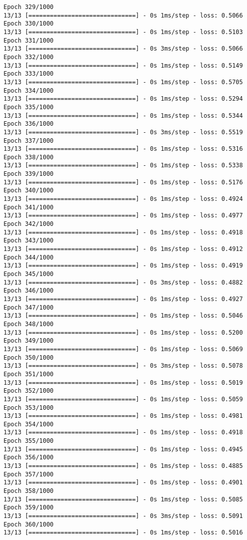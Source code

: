 \documentclass[11pt]{article}
\begin{document}
\begin{Verbatim}[commandchars=\\\{\}]
Epoch 329/1000
13/13 [==============================] - 0s 1ms/step - loss: 0.5066
Epoch 330/1000
13/13 [==============================] - 0s 1ms/step - loss: 0.5103
Epoch 331/1000
13/13 [==============================] - 0s 3ms/step - loss: 0.5066
Epoch 332/1000
13/13 [==============================] - 0s 1ms/step - loss: 0.5149
Epoch 333/1000
13/13 [==============================] - 0s 1ms/step - loss: 0.5705
Epoch 334/1000
13/13 [==============================] - 0s 1ms/step - loss: 0.5294
Epoch 335/1000
13/13 [==============================] - 0s 1ms/step - loss: 0.5344
Epoch 336/1000
13/13 [==============================] - 0s 3ms/step - loss: 0.5519
Epoch 337/1000
13/13 [==============================] - 0s 1ms/step - loss: 0.5316
Epoch 338/1000
13/13 [==============================] - 0s 1ms/step - loss: 0.5338
Epoch 339/1000
13/13 [==============================] - 0s 1ms/step - loss: 0.5176
Epoch 340/1000
13/13 [==============================] - 0s 1ms/step - loss: 0.4924
Epoch 341/1000
13/13 [==============================] - 0s 1ms/step - loss: 0.4977
Epoch 342/1000
13/13 [==============================] - 0s 1ms/step - loss: 0.4918
Epoch 343/1000
13/13 [==============================] - 0s 1ms/step - loss: 0.4912
Epoch 344/1000
13/13 [==============================] - 0s 1ms/step - loss: 0.4919
Epoch 345/1000
13/13 [==============================] - 0s 3ms/step - loss: 0.4882
Epoch 346/1000
13/13 [==============================] - 0s 1ms/step - loss: 0.4927
Epoch 347/1000
13/13 [==============================] - 0s 1ms/step - loss: 0.5046
Epoch 348/1000
13/13 [==============================] - 0s 1ms/step - loss: 0.5200
Epoch 349/1000
13/13 [==============================] - 0s 1ms/step - loss: 0.5069
Epoch 350/1000
13/13 [==============================] - 0s 3ms/step - loss: 0.5078
Epoch 351/1000
13/13 [==============================] - 0s 1ms/step - loss: 0.5019
Epoch 352/1000
13/13 [==============================] - 0s 1ms/step - loss: 0.5059
Epoch 353/1000
13/13 [==============================] - 0s 1ms/step - loss: 0.4981
Epoch 354/1000
13/13 [==============================] - 0s 1ms/step - loss: 0.4918
Epoch 355/1000
13/13 [==============================] - 0s 1ms/step - loss: 0.4945
Epoch 356/1000
13/13 [==============================] - 0s 1ms/step - loss: 0.4885
Epoch 357/1000
13/13 [==============================] - 0s 1ms/step - loss: 0.4901
Epoch 358/1000
13/13 [==============================] - 0s 1ms/step - loss: 0.5085
Epoch 359/1000
13/13 [==============================] - 0s 3ms/step - loss: 0.5091
Epoch 360/1000
13/13 [==============================] - 0s 1ms/step - loss: 0.5016

\end{Verbatim}
\end{document}
